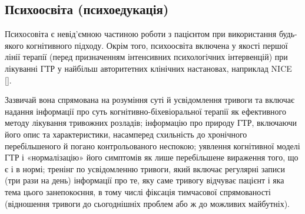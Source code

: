 \documentclass[twocolumn]{article}
\begin{document}
\subsection {Психоосвіта (психоедукація)}
\par Психосовіта є невід’ємною частиною роботи з пацієнтом при використання будь-якого когнітивного підходу. Окрім того, психоосвіта включена у якості першої лінії терапії (перед призначенням інтенсивних психологічних інтервенцій) при лікуванні ГТР у найбільш авторитетних клінічних настановах, наприклад NICE [\cite{bib16}].
\par Зазвичай вона спрямована на розуміння суті й усвідомлення тривоги та включає надання інформації про суть когнітивно-біхевіоральної терапії як ефективного методу лікування тривожних розладів; інформацію про природу ГТР, включаючи його опис та характеристики, насамперед схильність до хронічного перебільшеного й погано контрольованого неспокою; уявлення когнітивної моделі ГТР і «нормалізацію» його симптомів як лише перебільшене вираження того, що є і в нормі; тренінг по усвідомленню тривоги, який включає регулярні записи (три рази на день) інформації про те, яку саме тривогу відчуває пацієнт і яка тема цього занепокоєння, в тому числі фіксація тимчасової спрямованості (відношення тривоги до сьогоднішніх проблем або ж до можливих майбутніх).
\end{document}
